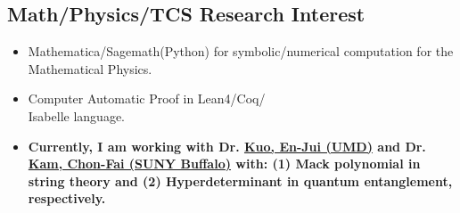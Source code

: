 \documentclass[11pt]{article}
\begin{document}
\begin{multicols*}{2}
\section*{Math/Physics/TCS Research Interest}
\begin{itemize}[noitemsep]
    \item Mathematica/Sagemath(Python) for symbolic/numerical computation for the Mathematical Physics.
    \item Computer Automatic Proof in Lean4/Coq/\\Isabelle language.  
    \item \textbf{ Currently, I am working with Dr. \href{https://www.bing.com/search?q=en-jui+kuo&gs_lcrp=EgZjaHJvbWUqBggBEEUYOzIGCAAQRRg5MgYIARBFGDsyBggCEEUYOzIGCAMQRRg7MgYIBBAAGEAyBggFEAAYQDIGCAYQRRg9MgYIBxBFGDwyBggIEEUYPNIBCDE2NjVqMGoxqAIAsAIA&FORM=ANAB01&PC=HCTS}{Kuo, En-Jui (UMD)} and Dr. \href{https://scholar.google.com.hk/citations?user=38TPAxMAAAAJ&hl=en}{Kam, Chon-Fai (SUNY Buffalo)} with: (1) Mack polynomial in string theory and (2) Hyperdeterminant in quantum entanglement, respectively. }
\end{itemize}


\end{multicols*}
\end{document}
